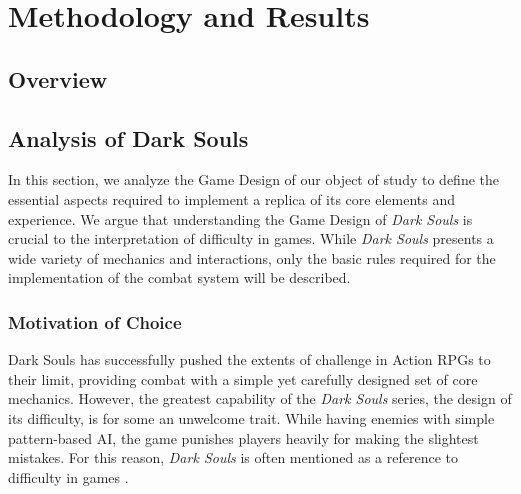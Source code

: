 \documentclass[cic,tc,english]{iiufrgs}
\begin{document}

\chapter{Methodology and Results}

\section{Overview}






\label{section-analysis-dark-souls}
\section{Analysis of Dark Souls}

In this section, we analyze the Game Design of our object of study to define the essential aspects required to implement a replica of its core elements and experience. We argue that understanding the Game Design of \emph{Dark Souls} is crucial to the interpretation of difficulty in games. While \emph{Dark Souls} presents a wide variety of mechanics and interactions, only the basic rules required for the implementation of the combat system will be described.

\subsection{Motivation of Choice}

Dark Souls has successfully pushed the extents of challenge in Action RPGs to their limit, providing combat with a simple yet carefully designed set of core mechanics. However, the greatest capability of the \emph{Dark Souls} series, the design of its difficulty, is for some an unwelcome trait. While having enemies with simple pattern-based AI, the game punishes players heavily for making the slightest mistakes. For this reason, \emph{Dark Souls} is often mentioned as a reference to difficulty in games \cite{URL_ExploringDesignOfDarkSouls}.
\end{document}
